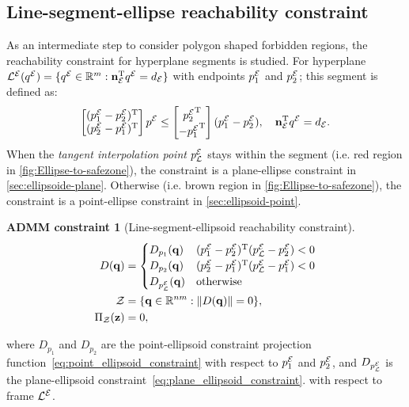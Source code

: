 \documentclass[10pt,twocolumn,twoside]{IEEEtran}
\newtheorem{constraint}{ADMM constraint}
\newcommand{\news}{\color{blue}}
\def\sZ{\mathcal{Z}}
\begin{document}
\subsection{Line-segment-ellipse reachability constraint}\label{chapter:ellipse to segment}
{\news As an intermediate step to consider polygon shaped forbidden regions, the reachability constraint for hyperplane segments is studied.
For hyperplane ${\mathcal{L}^{\mathcal{E}}}({q^{\mathcal{E}}}) = \{ {q^{\mathcal{E}}}\in\mathbb{R}^m:  \mathbf{n}_{\mathcal{E}}^\mathrm{T} {q^{\mathcal{E}}} = d_{\mathcal{E}}\}$ with endpoints ${p_1^{\mathcal{E}}}$ and ${p_2^{\mathcal{E}}}$; this segment is defined as:}
\begin{equation}
\begin{bmatrix}({p_1^{\mathcal{E}}}- {p_2^{\mathcal{E}}})^\mathrm{T}\\( {p_2^{\mathcal{E}}} - {p_1^{\mathcal{E}}})^\mathrm{T}\end{bmatrix}  {p^{\mathcal{E}}} \leq \begin{bmatrix} {p_2^{\mathcal{E}}}^\mathrm{T}\\- {p_1^{\mathcal{E}}}^\mathrm{T}\end{bmatrix}( {p_1^{\mathcal{E}}}- {p_2^{\mathcal{E}}}), \quad \mathbf{n}_{\mathcal{E}}^\mathrm{T} {q^{\mathcal{E}}} = d_{\mathcal{E}}.
\end{equation}
When the \emph{tangent interpolation point} ${p_{\mathcal{L}}^{\mathcal{E}}}$ stays within the segment (i.e. red region in \cref{fig:Ellipse-to-safezone}), the constraint is a plane-ellipse constraint in \cref{sec:ellipsoide-plane}. Otherwise (i.e. brown region in \cref{fig:Ellipse-to-safezone}), the constraint is a point-ellipse constraint in \cref{sec:ellipsoid-point}.

\begin{constraint}[Line-segment-ellipsoid reachability constraint]
\begin{align}
D(\vq) &=  \begin{cases}
D_{p_{1}}(\vq) & (\Eframe{p_1}-\Eframe{p_2})\transpose (\Eframe{p_{\cL}}-\Eframe{p_2})<0\\
D_{p_{2}}(\vq) & (\Eframe{p_2}-\Eframe{p_1})\transpose (\Eframe{p_{\cL}} -\Eframe{p_1})<0\\
D_\Eframe{p_{\cL}}(\vq) & \textrm{otherwise}
\end{cases} \label{eq:segment_ellipsoid_constraint}\\
  \sZ &= \{\vq\in\mathbb{R}^{nm}:\norm{D(\vq)} = 0 \},\\
   \Pi_\sZ(\vz) & = 0, 
\end{align}
\end{constraint}
where $D_{p_{1}}$ and $D_{p_{2}}$ are the point-ellipsoid constraint projection function~\eqref{eq:point_ellipsoid_constraint} with respect to ${p_{1}^{\mathcal{E}}}$ and ${p_{2}^{\mathcal{E}}}$, and $D_{p_{\mathcal{L}}^{\mathcal{E}}}$ is the plane-ellipsoid constraint~\eqref{eq:plane_ellipsoid_constraint}. with respect to frame ${\mathcal{L}^{\mathcal{E}}}$.
\end{document}
